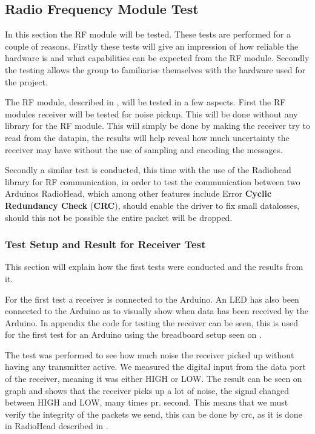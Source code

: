 \subsection{Radio Frequency Module Test}
In this section the RF module will be tested.
These tests are performed for a couple of reasons.
Firstly these tests will give an impression of how reliable the hardware is and what capabilities can be expected from the RF module. 
Secondly the testing allows the group to familiarise themselves with the hardware used for the project.

The RF module, described in , will be tested in a few aspects. 
First the RF modules receiver will be tested for noise pickup.
This will be done without any library for the RF module.
This will simply be done by making the receiver try to read from the datapin, the results will help reveal how much uncertainty the receiver may have without the use of sampling and encoding the messages.

Secondly a similar test is conducted, this time with the use of the Radiohead library for RF communication, in order to test the communication between two Arduinos
RadioHead, which among other features include Error \textbf{Cyclic Redundancy Check} (\textbf{CRC}), should enable the driver to fix small datalosses, should this not be possible the entire packet will be dropped. 

\subsubsection{Test Setup and Result for Receiver Test}
This section will explain how the first tests were conducted and the results from it.

For the first test a receiver is connected to the Arduino.
An LED has also been connected to the Arduino as to visually show when data has been received by the Arduino.
In appendix  the code for testing the receiver can be seen, this is used for the first test for an Arduino using the breadboard setup seen on .


The test was performed to see how much noise the receiver picked up without having any transmitter active. 
We measured the digital input from the data port of the receiver, meaning it was either HIGH or LOW. 
The result can be seen on graph and shows that the receiver picks up a lot of noise, the signal changed between HIGH and LOW, many times pr. second. 
This means that we must verify the integrity of the packets we send, this can be done by \gls{crc}, as it is done in RadioHead described in .

